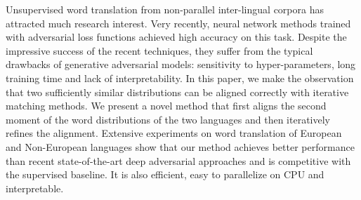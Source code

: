 Unsupervised word translation from non-parallel inter-lingual corpora has attracted much research interest. Very recently, neural network methods trained with adversarial loss functions achieved high accuracy on this task. Despite the impressive success of the recent techniques, they suffer from the typical drawbacks of generative adversarial models: sensitivity to hyper-parameters, long training time and lack of interpretability. In this paper, we make the observation that two sufficiently similar distributions can be aligned correctly with iterative matching methods. We present a novel method that first aligns the second moment of the word distributions of the two languages and then iteratively refines the alignment. Extensive experiments on word translation of European and Non-European languages show that our method achieves better performance than recent state-of-the-art deep adversarial approaches and is competitive with the supervised baseline. It is also efficient, easy to parallelize on CPU and interpretable.
